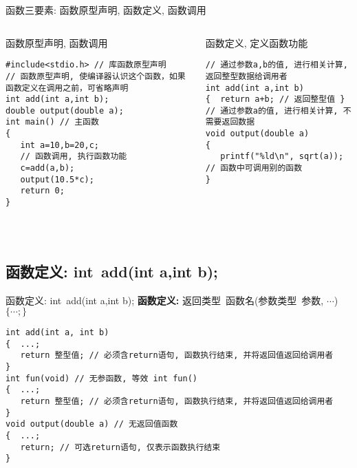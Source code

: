\begin{frame}{函数三要素: 函数原型声明, 函数定义, 函数调用}
\begin{columns}[T]
\begin{beamerboxesrounded}{函数原型声明, 函数调用}
\begin{lstlisting}
#include<stdio.h> // 库函数原型声明
// 函数原型声明, 使编译器认识这个函数，如果函数定义在调用之前，可省略声明
int add(int a,int b); 
double output(double a);
int main() // 主函数
{
   int a=10,b=20,c;
   // 函数调用, 执行函数功能
   c=add(a,b); 
   output(10.5*c);
   return 0; 
}
\end{lstlisting}
\end{beamerboxesrounded}
\begin{beamerboxesrounded}{函数定义, 定义函数功能}
\begin{lstlisting}
// 通过参数a,b的值, 进行相关计算, 返回整型数据给调用者
int add(int a,int b)
{  return a+b; // 返回整型值 }
// 通过参数a的值, 进行相关计算, 不需要返回数据
void output(double a)
{  
   printf("%ld\n", sqrt(a)); // 函数中可调用别的函数
}
\end{lstlisting}
\end{beamerboxesrounded}
\end{columns}
~\\
\end{frame}

\subsection{函数定义: int\, add(int a,int b);}

\begin{frame}{函数定义: int\, add(int a,int b);}
\textbf{函数定义: } 返回类型\, 函数名(参数类型\, 参数, $\cdots$) $\{\cdots ; \}$
\begin{lstlisting}
int add(int a, int b)
{  ...;
   return 整型值; // 必须含return语句, 函数执行结束, 并将返回值返回给调用者
}
int fun(void) // 无参函数, 等效 int fun() 
{  ...;
   return 整型值; // 必须含return语句, 函数执行结束, 并将返回值返回给调用者
}
void output(double a) // 无返回值函数
{  ...;
   return; // 可选return语句, 仅表示函数执行结束
}
\end{lstlisting}
\end{frame}

